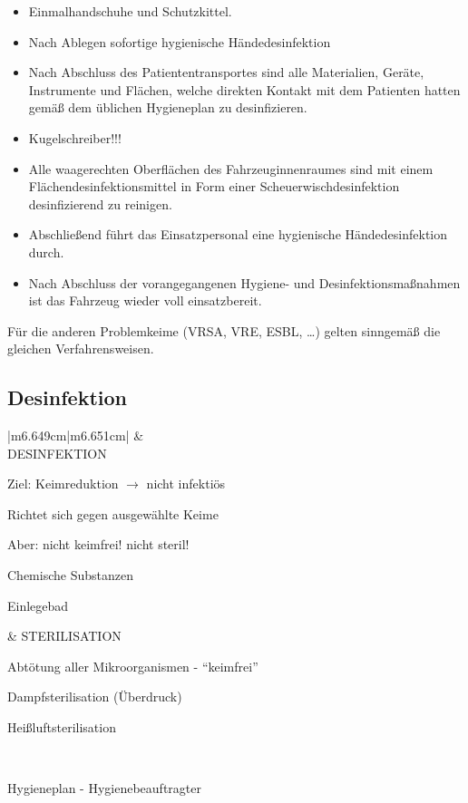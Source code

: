 \documentclass{article}
\begin{document}
\begin{itemize}
\item Einmalhandschuhe und Schutzkittel.

\item Nach Ablegen sofortige hygienische H\"andedesinfektion  

\end{itemize}
\begin{itemize}
\item Nach Abschluss des Patiententransportes sind alle Materialien,
Ger\"ate, Instrumente und Fl\"achen, welche direkten Kontakt mit dem
Patienten hatten gem\"a{\ss} dem \"ublichen Hygieneplan zu
desinfizieren.

\end{itemize}
\begin{itemize}
\item Kugelschreiber!!!

\item Alle waagerechten Oberfl\"achen des Fahrzeuginnenraumes sind mit
einem Fl\"achendesinfektionsmittel in Form einer
Scheuerwischdesinfektion desinfizierend zu reinigen.

\item Abschlie{\ss}end f\"uhrt das Einsatzpersonal eine hygienische
H\"andedesinfektion durch.

\end{itemize}
\begin{itemize}
\item Nach Abschluss der vorangegangenen Hygiene- und
Desinfektionsma{\ss}nahmen ist das Fahrzeug wieder voll einsatzbereit.

\end{itemize}
F\"ur die anderen Problemkeime (VRSA, VRE, ESBL, {\dots}) gelten
sinngem\"a{\ss} die gleichen Verfahrensweisen. 

\subsection[Desinfektion]{Desinfektion}
\begin{center}
\tablehead{}\begin{supertabular}{|m{6.649cm}|m{6.651cm}|}
\hline
 &
\\\hline
DESINFEKTION

Ziel: Keimreduktion ${\rightarrow}$ nicht infekti\"os

Richtet sich gegen ausgew\"ahlte Keime

Aber: nicht keimfrei! nicht steril!

Chemische Substanzen

Einlegebad

 &
STERILISATION

Abt\"otung aller Mikroorganismen -
{\textquotedblleft}keimfrei{\textquotedblright}

Dampfsterilisation (\"Uberdruck)

Hei{\ss}luftsterilisation

\\\hline
\end{supertabular}
\end{center}
Hygieneplan - Hygienebeauftragter
\end{document}
